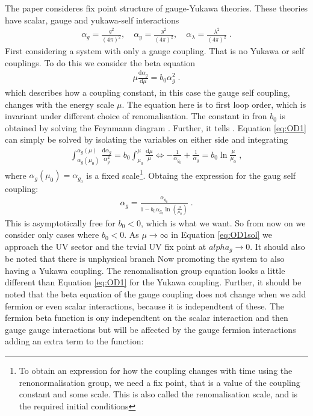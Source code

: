 The paper consideres fix point structure of gauge-Yukawa theories. These theories have scalar, gauge and yukawa-self interactions
\begin{align}
    \alpha_g=\frac{g^2}{(4\pi)^2},\quad \alpha_y=\frac{y^2}{(4\pi)^2},\quad \alpha_\lambda=\frac{\lambda^2}{(4\pi)^2}\;.
\end{align}
First considering a system with only a gauge coupling. That is no Yukawa or self couplings. To do this we consider the beta equation
\begin{align}
    \mu \frac{\mathrm d\alpha_g}{\mathrm d\mu}=b_0\alpha^2_g \;. 
    \label{eq:OD1}
\end{align}
which describes how a coupling constant, in this case the gauge self coupling, changes with the energy scale $\mu$. The equation here is to first loop order, which is invariant under different choice of renomalisation. The constant in fron $b_0$ is obtained by solving the Feynmann diagram . Further, it tells .
Equation \ref{eq:OD1} can simply be solved by isolating the variables on either side and integrating
\begin{align}
    \int^{\alpha_g(\mu)}_{\alpha_g(\mu_0)} \frac{\mathrm d\alpha_g}{\alpha_g^2} =b_0 \int^{\mu}_{\mu_0} \frac{\mathrm d\mu}{\mu}  \Longleftrightarrow -\frac{1}{\alpha_{g_0}}+\frac{1}{\alpha_g}=b_0 \ln\frac{\mu}{\mu_0}\;,
\end{align} 
where $\alpha_g(\mu_0)=\alpha_{g_0}$ is a fixed scale\footnote{To obtain an expression for how the coupling changes with time using the renonormalisation group, we need a fix point, that is a value of the coupling constant and some scale. This is also called the renomalisation scale, and is the required initial conditions}. Obtaing the expression for the gaug self coupling:
\begin{align}
    \alpha_g =\frac{\alpha_{g_0}}{1-b_0\alpha_{g_0}\ln(\frac{\mu}{\mu_0})}\;.
    \label{eq:OD1sol}
\end{align}
This is asymptotically free for $b_0<0$, which is what we want. So from now on we consider only cases where $b_0<0$. As $\mu\to \infty$ in Equation \ref{eq:OD1sol} we approach the UV sector and the trvial UV fix point at $alpha_g\to0$. It should also be noted that there is unphysical branch 
Now promoting the system to also having a Yukawa coupling. The renomalisation group equation looks a little different than Equation \ref{eq:OD1} for the Yukawa coupling. Further, it should be noted that the beta equation of the gauge coupling does not change when we add fermion or even scalar interactions, because it is independtent of these. The fermion beta function is ony independtent on the scalar interaction and then gauge gauge interactions but will be affected by the gauge fermion interactions adding an extra term to the function: 

